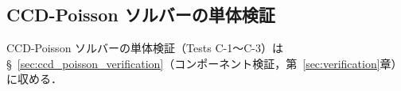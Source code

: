\subsection{CCD-Poisson ソルバーの単体検証}

CCD-Poisson ソルバーの単体検証（Tests C-1〜C-3）は
§~\ref{sec:ccd_poisson_verification}（コンポーネント検証，第~\ref{sec:verification}章）に収める．
